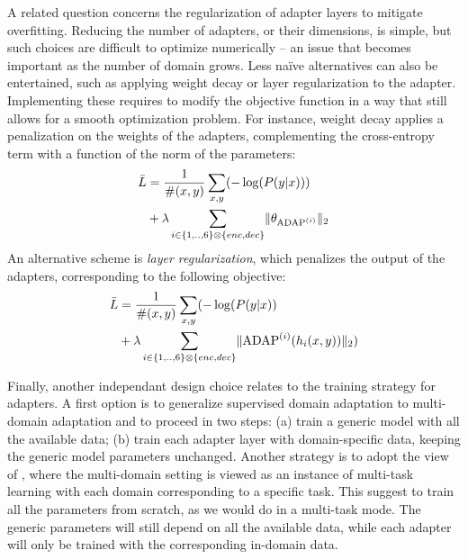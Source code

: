 \documentclass[11pt,a4paper]{article}
\newcommand{\fyDone}[1]{\done[FY]\Todo[FY:]{\textcolor{orange}{#1}}}
\newcommand{\fyFuture}[1]{\done[FY]\Todo[FY:]{\textcolor{red}{#1}}}
\begin{document}
A related question concerns the regularization of adapter layers to mitigate overfitting. Reducing the number of adapters, or their dimensions, is simple, but such choices are difficult to optimize numerically -- an issue that becomes important as the number of domain grows. Less naïve alternatives can also be entertained, such as applying weight decay or layer regularization to the adapter. Implementing these requires to modify the objective function in a way that still allows for a smooth optimization problem. For instance, weight decay applies a penalization on the weights of the adapters, complementing the cross-entropy term with a function of the norm of the parameters: \fyDone{The second summation also runs over $x,y$ ? I think not}
\begin{equation*}
  \begin{split}
    \bar{L} & = \frac{1}{\#(x,y)}\mathop{\sum}_{x,y}( - \log(P(y|x))) \\
    & + \lambda  \sum_{i \in \{1,..,6\} \otimes \{enc, dec\}} \normL{\theta_{\operatorname{ADAP}^{(i)}}}
  \end{split}
\end{equation*}
An alternative scheme is \emph{layer regularization}, which penalizes the output of the adapters, corresponding to the following objective:
\begin{equation*}
  \begin{split}
    \bar{L} & = \frac{1}{\#(x,y)}\mathop{\sum}_{x,y} (-\log(P(y|x)) \\
    & + \lambda \sum_{i \in \{1,..,6\} \otimes \{enc, dec\}} \normL{\operatorname{ADAP}^{(i)}(h_i(x,y))})
  \end{split}
\end{equation*}

Finally, another independant design choice relates to the training strategy for adapters. A first option is to generalize supervised domain adaptation to multi-domain adaptation and to proceed in two steps: (a) train a generic model with all the available data; (b) train each adapter layer with domain-specific data, keeping the generic model parameters unchanged. Another strategy is to adopt the view of \citet{Dredze08online}, where the multi-domain setting is viewed as an instance of multi-task learning \cite{Caruana97multitask} with each domain corresponding to a specific task. This suggest to train all the parameters from scratch, as we would do in a multi-task mode. The generic parameters will still depend on all the available data, while each adapter will only be trained with the corresponding in-domain data.\fyFuture{Does everyone need a domain? Do we need this discussion - talk about sentence level adaptation, better classifier pour MDL}
\end{document}
